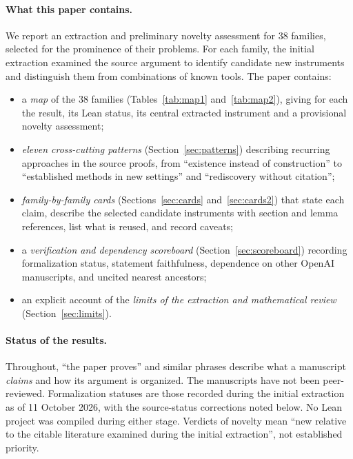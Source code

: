 \documentclass[11pt]{article}
\begin{document}
\paragraph{What this paper contains.} We report an extraction and preliminary novelty assessment for 38 families, selected for the prominence of their problems. For each family, the initial extraction examined the source argument to identify candidate new instruments and distinguish them from combinations of known tools. The paper contains:
\begin{itemize}
\item a \emph{map} of the 38 families (Tables~\ref{tab:map1} and~\ref{tab:map2}), giving for each the result, its Lean status, its central extracted instrument and a provisional novelty assessment;
\item \emph{eleven cross-cutting patterns} (Section~\ref{sec:patterns}) describing recurring approaches in the source proofs, from ``existence instead of construction'' to ``established methods in new settings'' and ``rediscovery without citation'';
\item \emph{family-by-family cards} (Sections~\ref{sec:cards} and~\ref{sec:cards2}) that state each claim, describe the selected candidate instruments with section and lemma references, list what is reused, and record caveats;
\item a \emph{verification and dependency scoreboard} (Section~\ref{sec:scoreboard}) recording formalization status, statement faithfulness, dependence on other OpenAI manuscripts, and uncited nearest ancestors;
\item an explicit account of the \emph{limits of the extraction and mathematical review} (Section~\ref{sec:limits}).
\end{itemize}



\paragraph{Status of the results.} Throughout, ``the paper proves'' and similar phrases describe what a manuscript \emph{claims} and how its argument is organized. The manuscripts have not been peer-reviewed. Formalization statuses are those recorded during the initial extraction as of 11 October 2026, with the source-status corrections noted below. No Lean project was compiled during either stage. Verdicts of novelty mean ``new relative to the citable literature examined during the initial extraction'', not established priority.
\end{document}
